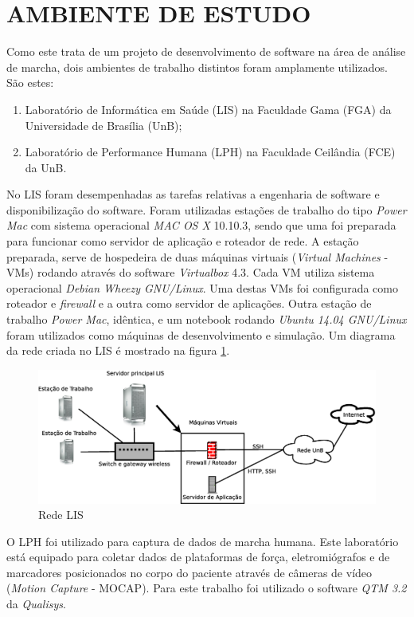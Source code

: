 \section[AMBIENTE DE ESTUDO]{AMBIENTE DE ESTUDO}

Como este trata de um projeto de desenvolvimento de software na área de análise de marcha, dois ambientes de trabalho distintos foram amplamente utilizados. São estes:

\begin{enumerate}
	\item Laboratório de Informática em Saúde (LIS) na Faculdade Gama (FGA) da Universidade de Brasília (UnB);
	\item Laboratório de Performance Humana (LPH) na Faculdade Ceilândia (FCE) da UnB.
\end{enumerate}

No LIS foram desempenhadas as tarefas relativas a engenharia de software e disponibilização do software.
Foram utilizadas estações de trabalho do tipo \emph{Power Mac} com sistema operacional \emph{MAC OS X} 10.10.3, sendo que uma foi preparada para funcionar como servidor de aplicação e roteador de rede. 
A estação preparada, serve de hospedeira de duas máquinas virtuais (\emph{Virtual Machines} - VMs) rodando através do software \emph{Virtualbox} 4.3. 
Cada VM utiliza sistema operacional \emph{Debian Wheezy GNU/Linux}. 
Uma destas VMs foi configurada como roteador e \emph{firewall} e a outra como servidor de aplicações.  
Outra estação de trabalho \emph{Power Mac}, idêntica, e um notebook rodando \emph{Ubuntu 14.04 GNU/Linux} foram utilizados como máquinas de desenvolvimento e simulação.
Um diagrama da rede criada no LIS é mostrado na figura \ref{lis_rede}.

\begin{figure}[ht]
	\centering
	\includegraphics[width=15cm]{figuras/lis_rede.eps}
	\caption{Rede LIS}
	\label{lis_rede}
\end{figure}

O LPH foi utilizado para captura de dados de marcha humana. Este laboratório está equipado para coletar dados de plataformas de força, eletromiógrafos e de marcadores posicionados no corpo do paciente através de câmeras de vídeo (\emph{Motion Capture} - MOCAP). Para este trabalho foi utilizado o software \emph{QTM 3.2} da \emph{Qualisys}. 
